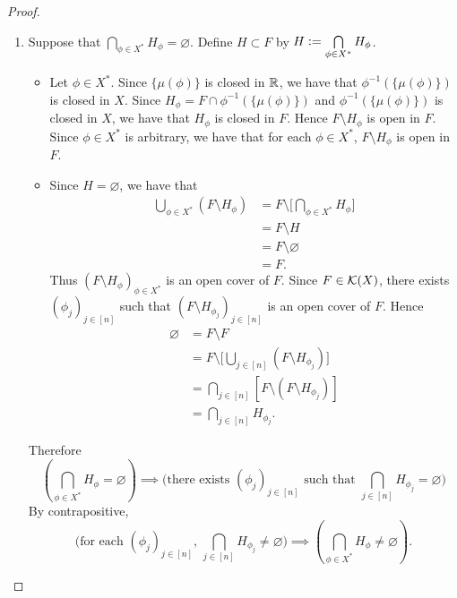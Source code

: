 \documentclass{book}
\begin{document}
	\begin{proof}\
		\begin{enumerate}
			\item Suppose that $\bigcap\limits_{\phi \in X^*} H_{\phi} = \varnothing$. Define $H \subset F$ by $H \vcentcolon= \bigcap\limits_{\phi \in X^*} H_{\phi}$. 
			\begin{itemize}
				\item Let $\phi \in X^*$. Since $\{\mu(\phi)\}$ is closed in $\mathbb{R}$, we have that $\phi^{-1}(\{\mu(\phi)\})$ is closed in $X$. Since $H_{\phi} = F \cap \phi^{-1}(\{\mu(\phi)\})$ and $\phi^{-1}(\{\mu(\phi)\})$ is closed in $X$, we have that $H_{\phi}$ is closed in $F$. Hence $F \setminus H_{\phi}$ is open in $F$. Since $\phi \in X^*$ is arbitrary, we have that for each $\phi \in X^*$, $F \setminus H_{\phi}$ is open in $F$. 
				\item Since $H = \varnothing$, we have that 
				\begin{align*}
					\bigcup\limits_{\phi \in X^*} (F \setminus H_{\phi})
					& = F \setminus \bigg[ \bigcap\limits_{\phi \in X^*} H_{\phi} \bigg] \\
					& = F \setminus H \\
					& = F \setminus \varnothing \\
					& = F.
				\end{align*}
				Thus $(F \setminus H_{\phi})_{\phi \in X^*}$ is an open cover of $F$. Since $F \in \mathcal{K}(X)$, there exists $(\phi_j)_{j \in [n]}$ such that $(F \setminus H_{\phi_j})_{j \in [n]}$ is an open cover of $F$. Hence 
				\begin{align*}
					\varnothing
					& = F \setminus F \\
					& = F \setminus \bigg[ \bigcup\limits_{j \in [n]} (F \setminus H_{\phi_j}) \bigg] \\
					& = \bigcap\limits_{j \in [n]} [F \setminus (F \setminus H_{\phi_j})] \\
					& = \bigcap\limits_{j \in [n]} H_{\phi_j}.
				\end{align*} 
			\end{itemize}
			Therefore 
			$$(\text{$\bigcap\limits_{\phi \in X^*} H_{\phi} = \varnothing$}) \implies \bigg(\text{there exists $(\phi_j)_{j \in [n]}$ such that $\bigcap\limits_{j \in [n]} H_{\phi_j} = \varnothing$} \bigg)$$
			By contrapositive, 
			$$\bigg(\text{for each $(\phi_j)_{j \in [n]}$, $\bigcap\limits_{j \in [n]} H_{\phi_j} \neq \varnothing$} \bigg) \implies (\text{$\bigcap\limits_{\phi \in X^*} H_{\phi} \neq \varnothing$}).$$

\end{enumerate}
\end{proof}
\end{document}
